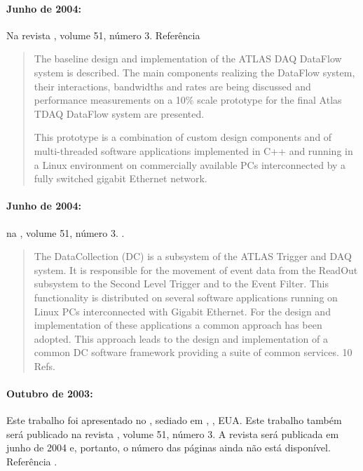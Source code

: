 \paragraph{Junho de 2004: } Na revista , volume 51, número 3. Referência~\cite{aa:tns-2004-3}

\begin{quotation}
The baseline design and implementation of the ATLAS DAQ DataFlow system is
described. The main components realizing the DataFlow system, their
interactions, bandwidths and rates are being discussed and performance
measurements on a 10\% scale prototype for the final Atlas TDAQ DataFlow
system are presented. 

This prototype is a combination of custom design components and of
multi-threaded software applications implemented in C++ and running in a Linux
environment on commercially available PCs interconnected by a fully switched
gigabit Ethernet network.
\end{quotation}

\paragraph{Junho de 2004: } na
, volume 51, número
3. \cite{aa:tns-2004-3}.  

\begin{quotation}
The DataCollection (DC) is a subsystem of the ATLAS Trigger and DAQ system. It
is responsible for the movement of event data from the ReadOut subsystem to
the Second Level Trigger and to the Event Filter. This functionality is
distributed on several software applications running on Linux PCs
interconnected with Gigabit Ethernet. For the design and implementation of
these applications a common approach has been adopted. This approach leads to
the design and implementation of a common DC software framework providing a
suite of common services. 10 Refs.
\end{quotation}

\paragraph{Outubro de 2003: } Este trabalho foi apresentado no , sediado em , ,
EUA. Este trabalho também será publicado na revista , volume 51, número 3. A revista será
publicada em junho de 2004 e, portanto, o número das páginas ainda não está
disponível. Referência
\cite{aa:tns-2004}.

